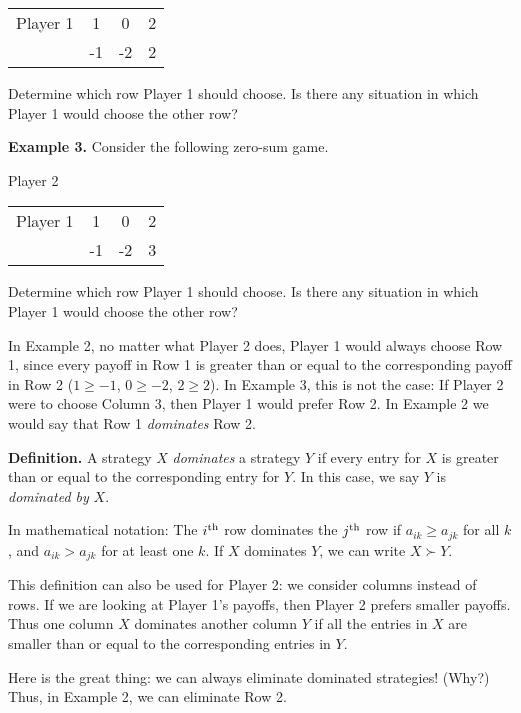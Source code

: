 \begin{tabular}{l|c|c|c|}\cline{2-4}
Player 1&1&0&2\\ \cline{2-4}
&-1&-2&2\\ \cline{2-4}

\end{tabular}
\medskip

Determine which row Player 1 should choose. Is there any situation in which Player 1 would choose the other row? 

\bigskip

{\bf Example 3.} Consider the following zero-sum game.

\hspace{1in}Player 2

\begin{tabular}{l|c|c|c|}\cline{2-4}
Player 1&1&0&2\\ \cline{2-4}
&-1&-2&3\\ \cline{2-4}

\end{tabular}
\medskip

Determine which row Player 1 should choose. Is there any situation in which Player 1 would choose the other row? 

\bigskip

In Example 2, no matter what Player 2 does, Player 1 would always choose Row 1, since every payoff in Row 1 is greater than or equal to the corresponding payoff in Row 2 ($1\ge -1$, $0\ge -2$, $2\ge 2$). In Example 3, this is not the case: If Player 2 were to choose Column 3, then Player 1 would prefer Row 2. In Example 2 we would say that Row 1 {\it dominates} Row 2.


{\bf Definition.} A strategy $X$ {\it dominates} a strategy $Y$ if every entry for $X$ is greater than or equal to the corresponding entry for $Y$. In this case, we say $Y$ is {\it dominated by} $X$.

In mathematical notation: The $i^{\rm th}$ row dominates the  $j^{\rm th}$ row if $a_{ik}\ge a_{jk}$ for all $k$, and $a_{ik}> a_{jk}$ for at least one $k$. If $X$ dominates $Y$, we can write $X\succ Y$.

This definition can also be used for Player 2: we consider columns instead of rows. If we are looking at Player 1's payoffs, then Player 2 prefers smaller payoffs. Thus one column $X$ dominates another column $Y$ if all the entries in $X$ are smaller than or equal to the corresponding entries in $Y$.  

Here is the great thing: we can always eliminate dominated strategies! (Why?)
Thus, in Example 2, we can eliminate Row 2.

